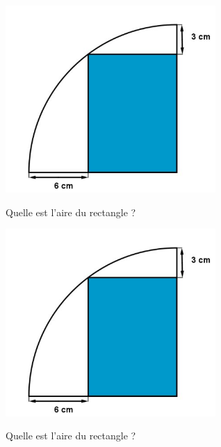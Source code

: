 \documentclass[a4paper,11pt,exos]{nsi} %
\begin{document}
\maketitle

\begin{center}
    \includegraphics[width=8cm]{Aire.jpg}
\end{center}

Quelle est l'aire du rectangle ?\\

\vspace*{3cm}


\maketitle

\begin{center}
    \includegraphics[width=8cm]{Aire.jpg}
\end{center}

Quelle est l'aire du rectangle ?
\end{document}
